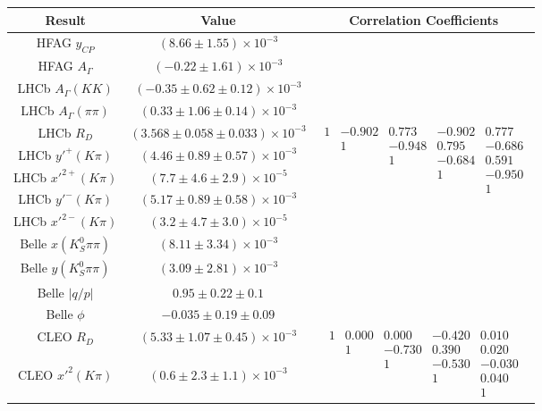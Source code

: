 \begin{table}[htdp]
\begin{center}
\begin{tabular}{|c|c|c|}
\hline
Result & Value & Correlation Coefficients \\
\hline \hline
HFAG $ y_{CP}$ & $(8.66\pm1.55)\times 10^{-3}$ & \\
HFAG $ A_\Gamma$ & $(-0.22\pm1.61)\times 10^{-3}$ & \\
\hline
LHCb $ A_\Gamma(KK)$ & $(-0.35\pm0.62\pm0.12)\times 10^{-3}$ & \\
LHCb $ A_\Gamma(\pi\pi)$ & $(0.33\pm1.06\pm0.14)\times 10^{-3}$ & \\
\hline
LHCb $ R_D$ & $(3.568\pm0.058\pm0.033)\times10^{-3}$ & \multirow{5}{*}{$\begin{array}{ccccc} 1 & -0.902 & 0.773& -0.902 & 0.777 \\& 1 &-0.948 & 0.795&  -0.686 \\ & & 1& -0.684 & 0.591\\ & & & 1 &-0.950 \\  & & & & 1\end{array}$}\\
LHCb $y'^+(K\pi)$ & $(4.46\pm0.89\pm0.57)\times 10^{-3}$ &   \\
LHCb $ x'^{2+}(K\pi)$ & $(7.7\pm4.6\pm2.9)\times 10^{-5}$ &\\
LHCb $y'^-(K\pi)$ & $(5.17\pm0.89\pm0.58)\times10^{-3}$ & \\
LHCb $ x'^{2-}(K\pi)$ & $(3.2\pm4.7\pm3.0)\times 10^{-5}$ & \\
\hline
Belle $x(K_S^0\pi\pi)$ & $(8.11\pm3.34)\times 10^{-3}$ & \\
Belle $y(K_S^0\pi\pi)$ & $(3.09\pm2.81)\times 10^{-3}$ & \\
Belle $|q/p|$ & $0.95\pm0.22\pm0.1$ & \\
Belle $\phi$ & $-0.035\pm0.19\pm0.09$ & \\
\hline
CLEO $ R_D$ & $(5.33\pm1.07\pm0.45)\times 10^{-3}$ & \multirow{5}{*}{$\begin{array}{ccccc} 1 & 0.000 & 0.000 & -0.420 & 0.010\\ & 1 & -0.730 & 0.390 & 0.020 \\ & & 1 &-0.530 & -0.030\\ & & & 1& 0.040\\ & & & &1\end{array}$}\\
CLEO $ x'^2(K\pi)$ & $(0.6\pm2.3\pm1.1)\times 10^{-3}$ & \\

\end{tabular}
\end{center}
\end{table}
